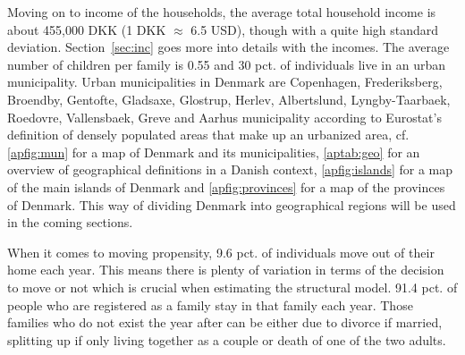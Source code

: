 Moving on to income of the households, the average total household income is about 455,000 DKK (1 DKK $\approx$ 6.5 USD), though with a quite high standard deviation. Section~\ref{sec:inc} goes more into details with the incomes. The average number of children per family is 0.55 and 30 pct. of individuals live in an urban municipality. Urban municipalities in Denmark are Copenhagen, Frederiksberg, Broendby, Gentofte, Gladsaxe, Glostrup, Herlev, Albertslund, Lyngby-Taarbaek, Roedovre, Vallensbaek, Greve and Aarhus municipality according to Eurostat's definition of densely populated areas that make up an urbanized area, cf. \autoref{apfig:mun} for a map of Denmark and its municipalities, \autoref{aptab:geo} for an overview of geographical definitions in a Danish context, \autoref{apfig:islands} for a map of the main islands of Denmark and \autoref{apfig:provinces} for a map of the provinces of Denmark. This way of dividing Denmark into geographical regions will be used in the coming sections.

When it comes to moving propensity, 9.6 pct. of individuals move out of their home each year. This means there is plenty of variation in terms of the decision to move or not which is crucial when estimating the structural model. 91.4 pct. of people who are registered as a family stay in that family each year. Those families who do not exist the year after can be either due to divorce if married, splitting up if only living together as a couple or death of one of the two adults.

